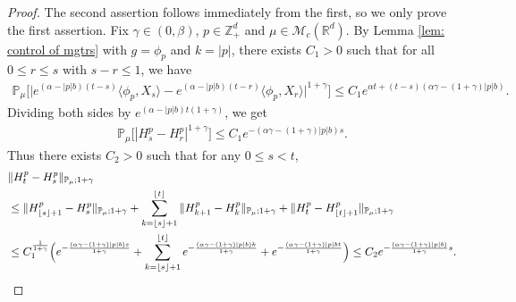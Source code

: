 \documentclass[12pt,a4paper]{amsart}
\theoremstyle{plain}
\theoremstyle{definition}
\numberwithin{equation}{section}
\begin{document}
\begin{proof}
  The second assertion follows immediately from the first, so we only prove the first assertion.
  Fix $\gamma \in (0,\beta)$, $p\in \mathbb{Z}_+^d$ and $\mu\in \mathcal M_c(\mathbb R^d)$.
  By Lemma \ref{lem: control of mgtrs} with $g=\phi_p$ and $k=|p|$, there exists $C_1>0$ such that for all $0\leq r\leq s $ with $s-r\leq1$, we have
\begin{align}
  \mathbb{P}_{\mu}\Big[\big|e^{(\alpha-|p|b)(t-s)}\langle\phi_p, X_s\rangle-e^{(\alpha-|p|b)(t-r)}\langle\phi_p, X_r\rangle\big|^{1+\gamma}\Big]
  \leq C_1e^{\alpha t+(t-s)(\alpha\gamma-(1+\gamma)|p|b)}.
\end{align}
Dividing both sides by $e^{(\alpha-|p|b) t(1+\gamma)}$, we get
\begin{align}
  \mathbb{P}_{\mu}\big[|H^p_s-H^p_r|^{1+\gamma}\big]
  \leq  C_1 e^{-(\alpha\gamma-(1+\gamma)|p|b)s}.
\end{align}
Thus there exists $C_2>0$ such that for any $0\leq s<t$,
\begin{align}
	& \|H^p_t-H^p_s\|_{\mathbb{P}_{\mu};1+\gamma} \\
	& \leq \|H^p_{\lfloor s \rfloor+1}-H^p_s\|_{\mathbb{P}_{\mu};1+\gamma}+\sum_{k=\lfloor s \rfloor+1}^{\lfloor t \rfloor}\|H^p_{k+1}-H^p_{k}\|_{\mathbb{P}_{\mu};1+\gamma}+\|H^p_t-H^p_{\lfloor t \rfloor+1}\|_{\mathbb{P}_{\mu};1+\gamma} \\
	& \leq C_1^{\frac{1}{1+\gamma}} \Big(e^{-\frac{(\alpha \gamma-(1+\gamma)|p|b) s}{1+\gamma}}+\sum_{k=\lfloor s \rfloor+1}^{\lfloor t \rfloor}e^{-\frac{(\alpha \gamma-(1+\gamma)|p|b) k}{1+\gamma}}+ e^{-\frac{(\alpha \gamma-(1+\gamma)|p|b t}{1+\gamma}}\Big)
   \leq C_2e^{-\frac{(\alpha \gamma-(1+\gamma)|p|b)}{1+\gamma}s}.
   \qedhere
\end{align}	
\end{proof}
\end{document}
